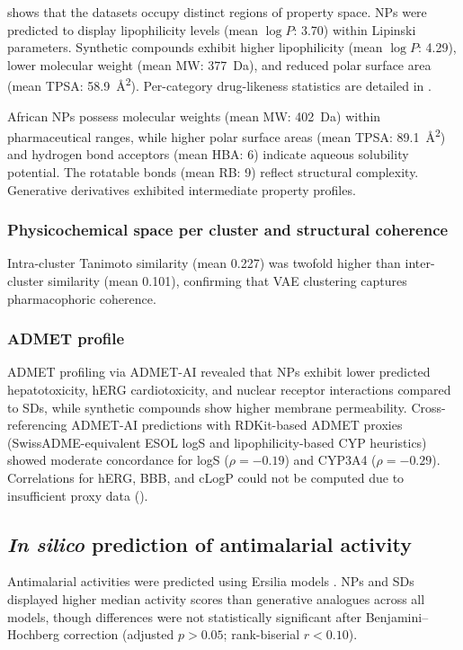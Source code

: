 \documentclass[journal=jcisd8,manuscript=article]{achemso}
\begin{document}
 shows that the datasets occupy distinct regions of property space. NPs were predicted to display lipophilicity levels (mean $\log P$: \num{3.70}) within Lipinski parameters. Synthetic compounds exhibit higher lipophilicity (mean $\log P$: \num{4.29}), lower molecular weight (mean MW: \qty{377}{\dalton}), and reduced polar surface area (mean TPSA: \qty{58.9}{\angstrom\squared}). Per-category drug-likeness statistics are detailed in .

African NPs possess molecular weights (mean MW: \qty{402}{\dalton}) within pharmaceutical ranges, while higher polar surface areas (mean TPSA: \qty{89.1}{\angstrom\squared}) and hydrogen bond acceptors (mean HBA: \num{6}) indicate aqueous solubility potential. The rotatable bonds (mean RB: \num{9}) reflect structural complexity. Generative derivatives exhibited intermediate property profiles.

\subsubsection{Physicochemical space per cluster and structural coherence}
Intra-cluster Tanimoto similarity (mean \num{0.227}) was twofold higher than inter-cluster similarity (mean \num{0.101}), confirming that VAE clustering captures pharmacophoric coherence.
\subsubsection{ADMET profile}

ADMET profiling via ADMET-AI \cite{Swanson2024} revealed that NPs exhibit lower predicted hepatotoxicity, hERG cardiotoxicity, and nuclear receptor interactions compared to SDs, while synthetic compounds show higher membrane permeability. Cross-referencing ADMET-AI predictions with RDKit-based ADMET proxies (SwissADME-equivalent ESOL logS and lipophilicity-based CYP heuristics) showed moderate concordance for logS ($\rho = -0.19$) and CYP3A4 ($\rho = -0.29$). Correlations for hERG, BBB, and cLogP could not be computed due to insufficient proxy data ().

\subsection{\textit{In silico} prediction of antimalarial activity}

Antimalarial activities were predicted using Ersilia models \cite{Turon2025}. NPs and SDs displayed higher median activity scores than generative analogues across all models, though differences were not statistically significant after Benjamini--Hochberg correction (adjusted $p > \num{0.05}$; rank-biserial $r < \num{0.10}$).
\end{document}
